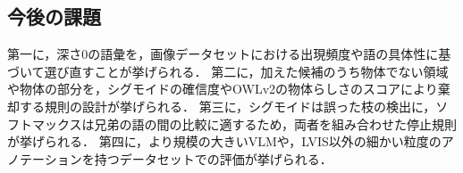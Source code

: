 \subsection{今後の課題}
第一に，深さ0の語彙を，画像データセットにおける出現頻度や語の具体性に基づいて選び直すことが挙げられる．
第二に，加えた候補のうち物体でない領域や物体の部分を，シグモイドの確信度やOWLv2の物体らしさのスコアにより棄却する規則の設計が挙げられる．
第三に，シグモイドは誤った枝の検出に，ソフトマックスは兄弟の語の間の比較に適するため，両者を組み合わせた停止規則が挙げられる．
第四に，より規模の大きいVLMや，LVIS以外の細かい粒度のアノテーションを持つデータセットでの評価が挙げられる．
